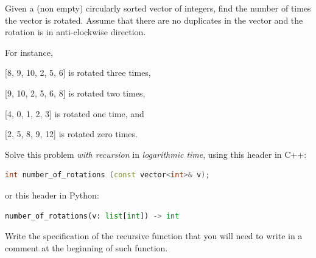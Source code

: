 

\Statement

Given a (non empty) circularly sorted vector of integers, find the number of
times the vector is rotated. Assume that there are no duplicates in the vector
and the rotation is in anti-clockwise direction.

\medskip

For instance,
\begin{itemize*}
\item {} [8, 9, 10, 2, 5, 6] is rotated three times,
\item {} [9, 10, 2, 5, 6, 8] is rotated two times,
\item {} [4, 0, 1, 2, 3] is rotated one time, and
\item {} [2, 5, 8, 9, 12] is rotated zero times.
\end{itemize*}

\medskip

Solve this problem \emph{with recursion}
in \emph{logarithmic time}, using this header in C++:

\begin{lstlisting}[language=C++,morekeywords={string,vector}]
    int number_of_rotations (const vector<int>& v);
\end{lstlisting}

or this header in Python:

\begin{lstlisting}[language=Python]
    number_of_rotations(v: list[int]) -> int
\end{lstlisting}

\medskip

Write the specification of the recursive function that you will need to write
in a comment at the beginning of such function.

\ObservationNoMain
